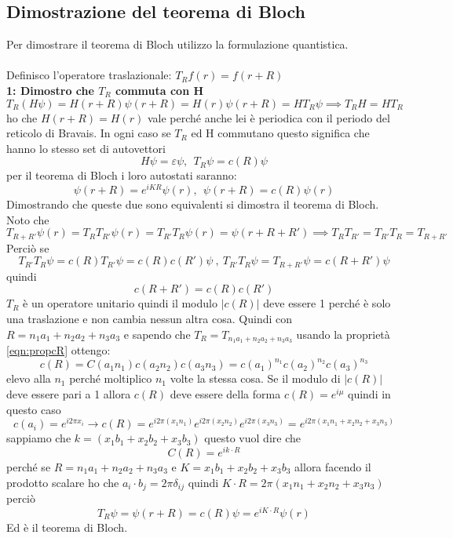 \subsection{Dimostrazione del teorema di Bloch}
Per dimostrare il teorema di Bloch utilizzo la formulazione quantistica. \\\\

Definisco l'operatore traslazionale: $T_R f(r) = f(r+R)$\\
\textbf{1: Dimostro che $T_R$ commuta con H}
\[ T_R (H\psi) = H(r + R) \psi(r + R) = H(r) \psi (r+R) = H T_R \psi \implies T_R H = H T_R \]
ho che $H(r+R) = H(r)$ vale perché anche lei è periodica con il periodo del reticolo di Bravais. In ogni caso se $T_R$ ed H commutano questo significa che hanno lo stesso set di autovettori
\[ H\psi = \varepsilon \psi, \ \ T_R \psi = c(R)\psi \]
per il teorema di Bloch i loro autostati saranno:
\[ \psi(r + R) = e^{iKR}\psi(r), \ \ \psi(r + R) = c(R) \psi(r) \]
Dimostrando che queste due sono equivalenti si dimostra il teorema di Bloch. \\
Noto che 
\[ T_{R+R'}\psi(r) = T_R T_{R'} \psi(r) = T_{R'} T_{R} \psi(r) = \psi(r + R + R') \implies T_R T_{R'} =  T_{R'} T_{R} = T_{R+R'} \]
Perciò se 
\[ T_{R'}T_{R}\psi = c(R)T_{R'}\psi = c(R)c(R') \psi \ , \ T_{R'}T_{R} \psi = T_{R + R'} \psi = c(R + R')\psi \]
quindi
\begin{equation}\label{eqn:propcR}  
    c(R + R') = c(R)c(R')
\end{equation}
$T_{R}$ è un operatore unitario quindi il modulo $|c(R)|$ deve essere 1 perché è solo una traslazione e non cambia nessun altra cosa. Quindi con $R = n_1 a_1 + n_2 a_2 + n_3 a_3$ e sapendo che $T_{R} = T_{n_1 a_1 + n_2 a_2 + n_3 a_3}$ usando la proprietà \ref{eqn:propcR} ottengo:
\[ c(R) = C(a_1n_1)c(a_2n_2)c(a_3n_3) = c(a_1)^{n_1}c(a_2)^{n_2}c(a_3)^{n_3} \]
elevo alla $n_1$ perché moltiplico $n_1$ volte la stessa cosa. Se il modulo di $|c(R)|$ deve essere pari a 1 allora $c(R)$ deve essere della forma $c(R) = e^{i\mu}$ quindi in questo caso
\[ c(a_i) = e^{i2\pi x_i} \longrightarrow c(R) = e^{i2\pi(x_1n_1)}e^{i2\pi(x_2n_2)}e^{i2\pi(x_3n_3)} = e^{i 2\pi (x_1 n_1 + x_2n_2 + x_3 n_3)}   \]
sappiamo che $k = (x_1 b_1 + x_2b_2 + x_3 b_3)$ questo vuol dire che 
\[ C(R) = e^{i k \cdot R} \]
perché se $R = n_1 a_1 + n_2 a_2 + n_3 a_3$ e $K = x_1 b_1 + x_2b_2 + x_3 b_3$ allora facendo il prodotto scalare ho che $a_i \cdot b_j = 2\pi \delta_{ij}$ quindi $K \cdot R = 2\pi (x_1 n_1 + x_2n_2 + x_3 n_3)$ perciò
\[ T_R \psi = \psi (r + R) = c(R) \psi = e^{i K\cdot R} \psi (r) \]
Ed è il teorema di Bloch.

